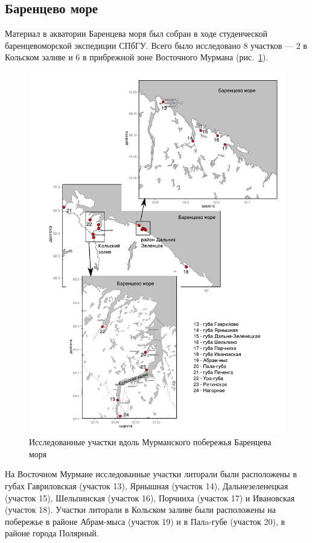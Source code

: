 		\subsection{Баренцево море}
Материал  в акватории Баренцева моря  был  собран    в ходе   студенческой баренцевоморской экспедиции СПбГУ. 
Всего было исследовано $8$ участков --- $2$ в Кольском заливе и   $6$  в   прибрежной   зоне  Восточного  Мурмана (рис.~\ref{ris:karta_Barents}).  
	\begin{figure}[p]
    \includegraphics[width=\textwidth]{../maps/Barents_sea1.pdf}
    \caption{Исследованные участки вдоль Мурманского побережья Баренцева моря}
    \label{ris:karta_Barents}
	\end{figure}
На   Восточном   Мурмане исследованные участки литорали  были   расположены   в   губах   Гавриловская (участок 13),  Ярнышная (участок 14), Дальнезеленецкая (участок 15), Шельпинская (участок 16), Порчниха (участок 17) и Ивановская (участок 18).
Участки литорали  в   Кольском   заливе   были  расположены на побережье в районе Абрам-мыса (участок 19) и в Палa-губе (участок 20), в районе города Полярный. 


